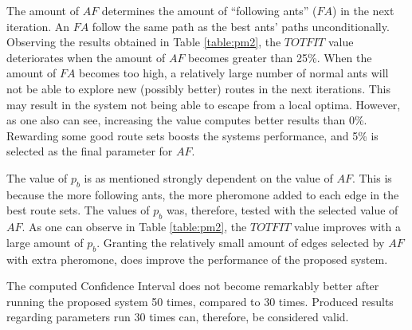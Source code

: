 The amount of $AF$ determines the amount of ``following ants'' ($FA$) in the next iteration. An $FA$ follow the same path as the best ants' paths unconditionally. Observing the results obtained in Table \vref{table:pm2}, the $TOTFIT$ value deteriorates when the amount of $AF$ becomes greater than 25\%. When the amount of $FA$ becomes too high, a relatively large number of normal ants will not be able to explore new (possibly better) routes in the next iterations. This may result in the system not being able to escape from a local optima. However, as one also can see, increasing the value computes better results than 0\%. Rewarding some good route sets boosts the systems performance, and 5\% is selected as the final parameter for $AF$. 

The value of $p_b$ is as mentioned strongly dependent on the value of $AF$. This is because the more following ants, the more pheromone added to each edge in the best route sets. The values of $p_b$ was, therefore, tested with the selected value of $AF$. As one can observe in Table \vref{table:pm2}, the $TOTFIT$ value improves with a large amount of $p_b$. Granting the relatively small amount of edges selected by $AF$ with extra pheromone, does improve the performance of the proposed system. 

The computed Confidence Interval does not become remarkably better after running the proposed system 50 times, compared to 30 times. Produced results regarding parameters run 30 times can, therefore, be considered valid.

